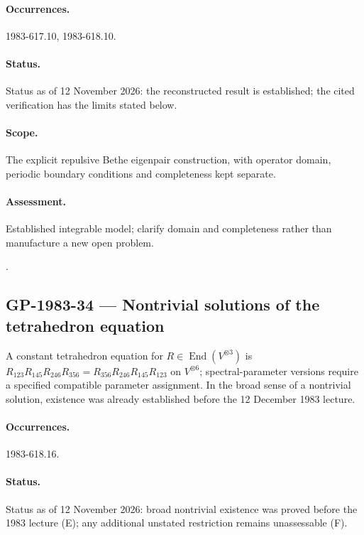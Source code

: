 \paragraph{Occurrences.} 1983-617.10, 1983-618.10.

\paragraph{Status.} Status as of 12 November 2026: the reconstructed result is established; the cited verification has the limits stated below.

\paragraph{Scope.} The explicit repulsive Bethe eigenpair construction, with operator domain, periodic boundary conditions and completeness kept separate.

\paragraph{Assessment.} Established integrable model; clarify domain and completeness rather than manufacture a new open problem.

\noindent\citep{yang1967manybody,yang1968smatrix}.

\subsection{GP-1983-34 --- Nontrivial solutions of the tetrahedron equation}

\label{problem:GP-1983-34}

A constant tetrahedron equation for $R\in\operatorname{End}(V^{\otimes3})$ is $R_{123}R_{145}R_{246}R_{356}=R_{356}R_{246}R_{145}R_{123}$ on $V^{\otimes6}$; spectral-parameter versions require a specified compatible parameter assignment. In the broad sense of a nontrivial solution, existence was already established before the 12 December 1983 lecture.

\paragraph{Occurrences.} 1983-618.16.

\paragraph{Status.} Status as of 12 November 2026: broad nontrivial existence was proved before the 1983 lecture (E); any additional unstated restriction remains unassessable (F).

